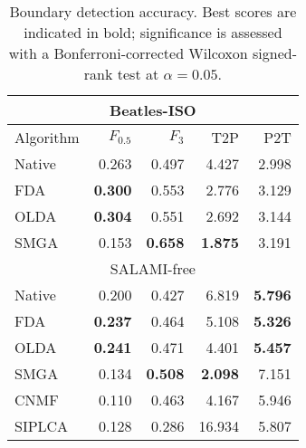 \begin{table}
\centering
\caption{Boundary detection accuracy. Best scores are indicated in bold; significance is assessed with a Bonferroni-corrected Wilcoxon signed-rank test at $\alpha=0.05$.\label{tab:results}}
\begin{tabular}{lrrrr}
\multicolumn{5}{c}{Beatles-ISO}\\
\toprule%
Algorithm & $F_{0.5}$       & $F_3$             & T2P               & P2T\\
\hline
Native  & 0.263             & 0.497             & 4.427             & 2.998\\
FDA     & \textbf{0.300}    & 0.553             & 2.776             & 3.129\\
OLDA    & \textbf{0.304}    & 0.551             & 2.692             & 3.144\\
\hline
SMGA    & 0.153             & \textbf{0.658}    & \textbf{1.875}    & 3.191\\
\toprule%
\multicolumn{5}{c}{SALAMI-free}\\
\hline
Native  & 0.200             & 0.427             & 6.819             & \textbf{5.796}\\
FDA     & \textbf{0.237}    & 0.464             & 5.108             & \textbf{5.326}\\
OLDA    & \textbf{0.241}    & 0.471             & 4.401             & \textbf{5.457}\\
\hline
SMGA    & 0.134             & \textbf{0.508}    & \textbf{2.098}    & 7.151\\
CNMF    & 0.110             & 0.463             & 4.167             & 5.946\\
SIPLCA  & 0.128             & 0.286             & 16.934            & 5.807\\
\bottomrule%
\end{tabular}
\end{table}
